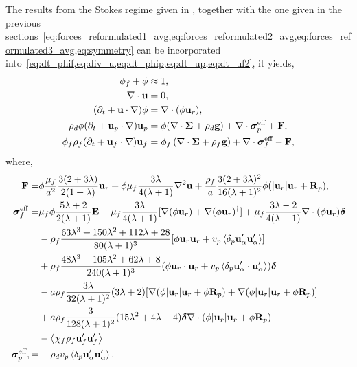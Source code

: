 The results from the Stokes regime given in \citet{fintzi2025averaged}, together with the one given in the previous sections~\eqref{eq:forces_reformulated1_avg,eq:forces_reformulated2_avg,eq:forces_reformulated3_avg,eq:symmetry} can be incorporated into~\ref{eq:dt_phif,eq:div_u,eq:dt_phip,eq:dt_up,eq:dt_uf2}, it yields, 
\begin{align}
    \label{eq:firstSys}
    \phi_f + \phi &\approx 1,\\
    \div \textbf{u} &= 0,\\
    (\pddt + \textbf{u} \cdot \grad)\phi
    &=
    \div (\phi \textbf{u}_r),\\
    \rho_d \phi (\pddt + \textbf{u}_p \cdot \grad)\textbf{u}_p
    &=
    \phi(\div \bm\Sigma
    + \rho_d  \textbf{g})
    + \div \bm\sigma_p^\text{eff}
    + \textbf{F},
    \label{eq:before_the_lastSys}
    \\
    \phi_f \rho_f(\pddt + \textbf{u}_f  \cdot \grad) \textbf{u}_f
    &= \phi_f 
    \left(\div \bm\Sigma
    + \rho_f \textbf{g}\right)
    + \div \bm\sigma_f^\text{eff}
    -\textbf{F},
    \label{eq:lastSys}
\end{align}
where,
\begin{align}
    \textbf{F}=&
    \phi
    \frac{\mu_f}{a^2}
    \frac{3(2+3\lambda)}{2(1+\lambda)}\textbf{u}_r
    + \phi\mu_f  \frac{3\lambda}{4(\lambda +1)} \grad^2 \textbf{u}
    + \frac{\rho_f}{a} \frac{3 (2+3\lambda)^2}{16 (\lambda+1)^2}
    \phi (|\textbf{u}_r| \textbf{u}_r+ \textbf{R}_p),
    \label{eq:drag_final}
    \\
    \bm\sigma_f^\text{eff}
    =&
     \mu_f \phi \frac{5\lambda +2}{2(\lambda+1)} \textbf{E}
    - \mu_f \frac{3\lambda}{4(\lambda+1)} [
    \grad(\phi \textbf{u}_r)
    + \grad(\phi \textbf{u}_r)^\dagger]
    + \mu_f \frac{3\lambda - 2}{4(\lambda+1)} \div(\phi \textbf{u}_r)  \bm\delta\nonumber\nonumber \\
    &- \rho_f  \frac{63 \lambda^{3} + 150 \lambda^{2} + 112 \lambda + 28}{80 (\lambda+1)^{3}} [\phi \textbf{u}_r \textbf{u}_r + v_p \pavg{\textbf{u}_\alpha'\textbf{u}_\alpha'} ] \nonumber \\ 
    &+ \rho_f   \frac{48\lambda^3 + 105 \lambda^2 + 62\lambda + 8}{240 (\lambda+1)^3} (\phi \textbf{u}_r\cdot \textbf{u}_r+ v_p \pavg{\textbf{u}_\alpha'\cdot \textbf{u}_\alpha'}) \bm\delta\nonumber \\
    &- a\rho_f\frac{ 3\lambda}{32(\lambda+1)^2} ( 3\lambda+2) [\grad (\phi|\textbf{u}_r|\textbf{u}_r+\phi\textbf{R}_p) + \grad (\phi|\textbf{u}_r|\textbf{u}_r+\phi\textbf{R}_p)]\nonumber \\
    &+ a\rho_f\frac{3}{128(\lambda+1)^2} ( 15\lambda^2+4\lambda -4) \bm\delta \div(\phi|\textbf{u}_r|\textbf{u}_r+ \phi\textbf{R}_p)\nonumber \\
    &-\avg{\chi_f\rho_f \textbf{u}_f'\textbf{u}_f'}
    \label{eq:sigma_feffff}\\
    \bm\sigma_p^\text{eff},
    =&-\rho_d v_p\pavg{\textbf{u}_\alpha'\textbf{u}_\alpha'}.
\end{align}
